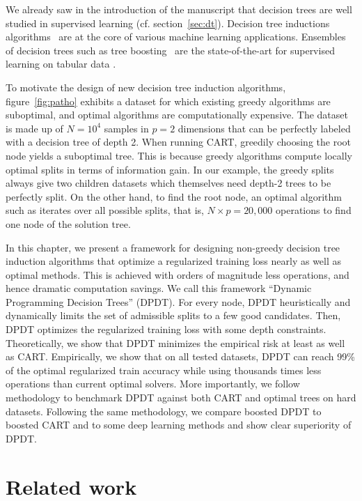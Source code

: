 We already saw in the introduction of the manuscript that decision trees are well studied in supervised learning (cf. section~\ref{sec:dt}).
Decision tree inductions algorithms~\cite{ID3,c45,breiman1984classification} are at the core of various machine learning applications. 
Ensembles of decision trees such as tree boosting~\cite{stcohFriedman,FriedmanBoosting,xgb,10.5555/3327757.3327770} are the state-of-the-art for supervised learning on tabular data \cite{grinsztajn2022tree}.

To motivate the design of new decision tree induction algorithms, figure~\ref{fig:patho} exhibits a dataset for which existing greedy algorithms are suboptimal, and optimal algorithms are computationally expensive. 
The dataset is made up of $N=10^4$ samples in $p=2$ dimensions that can be perfectly labeled with a decision tree of depth 2. When running CART, greedily choosing the root node yields a suboptimal tree.
This is because greedy algorithms compute locally optimal splits in terms of information gain. In our example, the greedy splits always give two children datasets which themselves need depth-2 trees to be perfectly split.
On the other hand, to find the root node, an optimal algorithm such as \cite{quantbnb} iterates over all possible splits, that is, $N\times p={20,000}$ operations to find one node of the solution tree.

In this chapter, we present a framework for designing non-greedy decision tree induction algorithms that optimize a regularized training loss nearly as well as optimal methods. This is achieved with orders of magnitude less operations, and hence dramatic computation savings.
We call this framework ``Dynamic Programming Decision Trees'' (DPDT). For every node, DPDT heuristically and dynamically limits the set of admissible splits to a few good candidates. Then, DPDT optimizes the regularized training loss with some depth constraints.
Theoretically, we show that DPDT minimizes the empirical risk at least as well as CART\@.
Empirically, we show that on all tested datasets, DPDT can reach 99\% of the optimal regularized train accuracy while using thousands times less operations than current optimal solvers. 
More importantly, we follow \cite{grinsztajn2022tree} methodology to benchmark DPDT against both CART and optimal trees on hard datasets. Following the same methodology, we compare boosted DPDT \cite{FREUND1997119} to boosted CART and to some deep learning methods and show clear superiority of DPDT.

\section{Related work}

